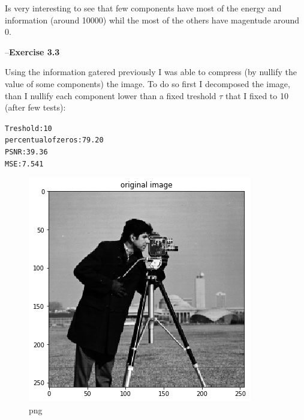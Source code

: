 \documentclass{letter}
\newcommand{\paragraph}[1]{\smallskip--\noindent\textbf{#1}}
\begin{document}
Is very interesting to see that few components have most of the energy and
information (around 10000) whil the most of the others have magentude around
0.

\paragraph{Exercise 3.3}\label{exercise-3.3}

Using the information gatered previously I was able to compress (by nullify
the value of some components) the image. To do so first I decomposed the
image, than I nullify each component lower than a fixed treshold $\tau$ that I
fixed to 10 (after few tests):
\begin{alltt}

Treshold: 10
percentual of zeros: 79.20%
PSNR: 39.36
MSE: 7.541

\end{alltt}
\begin{figure}[h]
  \begin{center}
    \includegraphics{output_15_1.png} 
  \end{center}
  \caption{png}
\end{figure}
\end{document}
